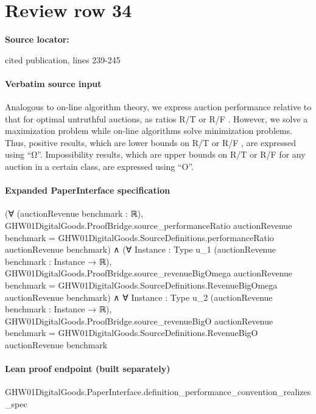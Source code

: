 \documentclass[10pt]{article}
\begin{document}
\section*{Review row 34}
\textbf{Source locator:} {\footnotesize\raggedright cited publication, lines 239-\allowbreak{}245\par}
\paragraph{Verbatim source input}
\begin{ReviewVerbatim}
Analogous to on-line algorithm theory, we express
auction performance relative to that for optimal untruthful auctions, as ratios R/T or R/F . However,
we solve a maximization problem while on-line algorithms solve minimization problems. Thus, positive
results, which are lower bounds on R/T or R/F , are
expressed using “Ω”. Impossibility results, which are
upper bounds on R/T or R/F for any auction in a
certain class, are expressed using “O”.
\end{ReviewVerbatim}


\paragraph{Expanded PaperInterface specification}
\begin{ReviewVerbatim}
(∀ (auctionRevenue benchmark : ℝ),
    GHW01DigitalGoods.ProofBridge.source_performanceRatio auctionRevenue benchmark =
      GHW01DigitalGoods.SourceDefinitions.performanceRatio auctionRevenue benchmark) ∧
  (∀ {Instance : Type u_1} (auctionRevenue benchmark : Instance → ℝ),
      GHW01DigitalGoods.ProofBridge.source_revenueBigOmega auctionRevenue benchmark =
        GHW01DigitalGoods.SourceDefinitions.RevenueBigOmega auctionRevenue benchmark) ∧
    ∀ {Instance : Type u_2} (auctionRevenue benchmark : Instance → ℝ),
      GHW01DigitalGoods.ProofBridge.source_revenueBigO auctionRevenue benchmark =
        GHW01DigitalGoods.SourceDefinitions.RevenueBigO auctionRevenue benchmark
\end{ReviewVerbatim}

\paragraph{Lean proof endpoint (built separately)}\begin{ReviewVerbatim}
GHW01DigitalGoods.PaperInterface.definition_performance_convention_realizes_spec
\end{ReviewVerbatim}
\end{document}
